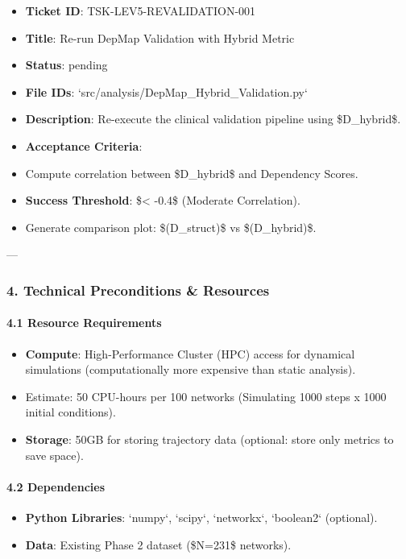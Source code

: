 \documentclass{article}
\begin{document}
\begin{itemize}
\item   \textbf{Ticket ID}: TSK-LEV5-REVALIDATION-001
\item   \textbf{Title}: Re-run DepMap Validation with Hybrid Metric
\item   \textbf{Status}: pending
\item   \textbf{File IDs}: `src/analysis/DepMap\_Hybrid\_Validation.py`
\item   \textbf{Description}: Re-execute the clinical validation pipeline using \$D\_{hybrid}\$.
\item   \textbf{Acceptance Criteria}:
\item   Compute correlation between \$\Delta D\_{hybrid}\$ and Dependency Scores.
\item   \textbf{Success Threshold}: \$\rho < -0.4\$ (Moderate Correlation).
\item   Generate comparison plot: \$\rho(D\_{struct})\$ vs \$\rho(D\_{hybrid})\$.
\end{itemize}

---

\subsubsection{4. Technical Preconditions \& Resources}

\paragraph{4.1 Resource Requirements}
\begin{itemize}
\item   \textbf{Compute}: High-Performance Cluster (HPC) access for dynamical simulations (computationally more expensive than static analysis).
\item   Estimate: 50 CPU-hours per 100 networks (Simulating 1000 steps x 1000 initial conditions).
\item   \textbf{Storage}: 50GB for storing trajectory data (optional: store only metrics to save space).
\end{itemize}

\paragraph{4.2 Dependencies}
\begin{itemize}
\item   \textbf{Python Libraries}: `numpy`, `scipy`, `networkx`, `boolean2` (optional).
\item   \textbf{Data}: Existing Phase 2 dataset (\$N=231\$ networks).
\end{itemize}
\end{document}
